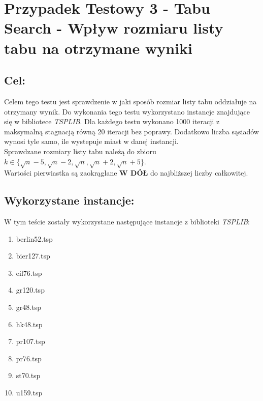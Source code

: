 \section{Przypadek Testowy 3 - Tabu Search - Wpływ rozmiaru listy tabu na otrzymane wyniki}
  \subsection{Cel:}
    Celem tego testu jest sprawdzenie w jaki sposób rozmiar listy tabu oddziałuje na otrzymany wynik. 
    Do wykonania tego testu wykorzystano instancje znajdujące się w bibliotece \textit{TSPLIB}.
    Dla każdego testu wykonano 1000 iteracji z maksymalną stagnacją równą 20 iteracji bez poprawy. 
    Dodatkowo liczba sąsiadów wynosi tyle samo, ile wystepuje miast w danej instancji. \\
    Sprawdzane rozmiary listy tabu należą do zbioru $k \in \{\sqrt{n}-5,\sqrt{n}-2,\sqrt{n},\sqrt{n}+2,\sqrt{n}+5$\}. \\
    Wartości pierwiastka są zaokrąglane \textbf{W DÓŁ} do najbliższej liczby całkowitej.
  \subsection{Wykorzystane instancje: }
  W tym teście zostały wykorzystane następujące instancje z biblioteki \textit{TSPLIB}:
  \begin{enumerate}
    \item berlin52.tsp
    \item bier127.tsp
    \item eil76.tsp
    \item gr120.tsp 
    \item gr48.tsp
    \item hk48.tsp
    \item pr107.tsp
    \item pr76.tsp
    \item st70.tsp
    \item u159.tsp
  \end{enumerate}
